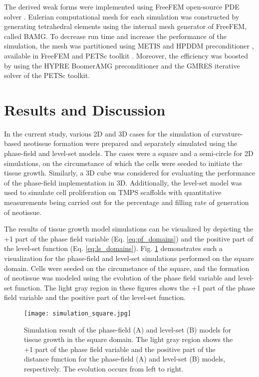 The derived weak forms were implemented using FreeFEM open-source PDE solver \cite{Hecht2012}. Eulerian computational mesh for each simulation was constructed by generating tetrahedral elements using the internal mesh generator of FreeFEM, called BAMG. To decrease run time and increase the performance of the simulation, the mesh was partitioned using  METIS \cite{METIS1998} and HPDDM preconditioner \cite{Jolivet2013}, available in FreeFEM and PETSc toolkit \cite{petsc}. Moreover, the efficiency was boosted by using the HYPRE BoomerAMG preconditioner \cite{Falgout2002} and the GMRES iterative solver \cite{Saad1986} of the PETSc toolkit.


\section{Results and Discussion}

In the current study, various 2D and 3D cases for the simulation of curvature-based neotissue formation were prepared and separately simulated using the phase-field and level-set models. The cases were a square and a semi-circle for 2D simulations, on the circumstance of which the cells were seeded to initiate the tissue growth. Similarly, a 3D cube was considered for evaluating the performance of the phase-field implementation in 3D. Additionally, the level-set model was used to simulate cell proliferation on TMPS scaffolds with quantitative measurements being carried out for the percentage and filling rate of generation of neotissue.

The results of tissue growth model simulations can be visualized by depicting the +1 part of the phase field variable (Eq. \ref{eq:pf_domains}) and the positive part of the level-set function (Eq. \ref{eq:ls_domains}). Fig. \ref{fig:tissue_simulation_square} demonstrates such a visualization for the phase-field and level-set simulations performed on the square domain. Cells were seeded on the circumstance of the square, and the formation of neotissue was modeled using the evolution of the phase field variable and level-set function. The light gray region in these figures shows the +1 part of the phase field variable and the positive part of the level-set function.

\begin{figure}
\medskip
\centering
\texttt{[image: simulation\_square.jpg]}
\caption[Simulation result of tissue growth in the square domain]{Simulation result of the phase-field (A) and level-set (B) models for tissue growth in the square domain. The light gray region shows the +1 part of the phase field variable and the positive part of the distance function for the phase-field (A) and level-set (B) models, respectively. The evolution occurs from left to right.}
\label{fig:tissue_simulation_square}
\end{figure}

